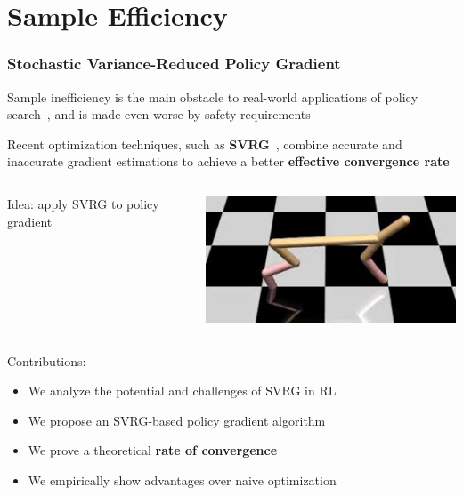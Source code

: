 \documentclass{beamer}
\begin{document}
\section{Sample Efficiency}


\begin{frame}
\frametitle{Stochastic Variance-Reduced Policy Gradient~\cite{papini2018stochastic}}
Sample inefficiency is the main obstacle to real-world applications of policy search~\cite{recht2018tour}, and is made even worse by safety requirements

\vfill

Recent optimization techniques, such as \textbf{SVRG}~\cite{johnson2013accelerating}, combine accurate and inaccurate gradient estimations to achieve a better \textbf{effective convergence rate}

\vfill

\begin{columns}
	\begin{column}{0.6\textwidth}
		Idea: apply SVRG to policy gradient
	\end{column}
	\begin{column}{0.3\textwidth}
		\includegraphics[width=\textwidth]{pics/cheetah.jpeg}
	\end{column}
\end{columns}

\vfill

Contributions:
\begin{itemize}
	\item We analyze the potential and challenges of SVRG in RL
	\item We propose an SVRG-based policy gradient algorithm
	\item We prove a theoretical \textbf{rate of convergence}
	\item We empirically show advantages over naive optimization
\end{itemize}

\end{frame}
\end{document}
